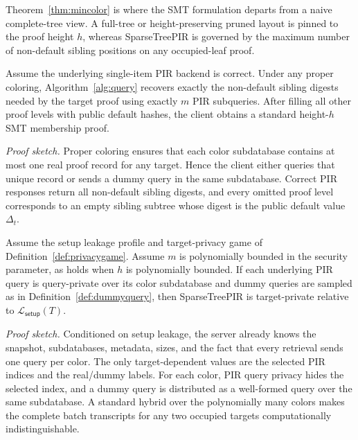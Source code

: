 \begin{remark}
Theorem~\ref{thm:mincolor} is where the SMT formulation departs from a naive complete-tree view. A full-tree or height-preserving pruned layout is pinned to the proof height $h$, whereas SparseTreePIR is governed by the maximum number of non-default sibling positions on any occupied-leaf proof.
\end{remark}

\begin{theorem}
\label{thm:correctness}
Assume the underlying single-item PIR backend is correct. Under any proper coloring, Algorithm~\ref{alg:query} recovers exactly the non-default sibling digests needed by the target proof using exactly $m$ PIR subqueries. After filling all other proof levels with public default hashes, the client obtains a standard height-$h$ SMT membership proof.
\end{theorem}

\noindent\emph{Proof sketch.}
Proper coloring ensures that each color subdatabase contains at most one real proof record for any target. Hence the client either queries that unique record or sends a dummy query in the same subdatabase. Correct PIR responses return all non-default sibling digests, and every omitted proof level corresponds to an empty sibling subtree whose digest is the public default value $\Delta_t$.

\begin{theorem}
\label{prop:privacy}
Assume the setup leakage profile and target-privacy game of Definition~\ref{def:privacygame}. Assume $m$ is polynomially bounded in the security parameter, as holds when $h$ is polynomially bounded. If each underlying PIR query is query-private over its color subdatabase and dummy queries are sampled as in Definition~\ref{def:dummyquery}, then SparseTreePIR is target-private relative to $\mathcal{L}_{\mathsf{setup}}(T)$.
\end{theorem}

\noindent\emph{Proof sketch.}
Conditioned on setup leakage, the server already knows the snapshot, subdatabases, metadata, sizes, and the fact that every retrieval sends one query per color. The only target-dependent values are the selected PIR indices and the real/dummy labels. For each color, PIR query privacy hides the selected index, and a dummy query is distributed as a well-formed query over the same subdatabase. A standard hybrid over the polynomially many colors makes the complete batch transcripts for any two occupied targets computationally indistinguishable.

